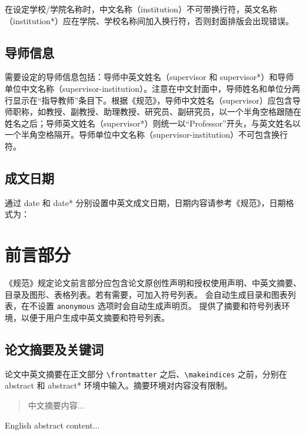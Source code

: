 \documentclass[bachelor, comfort]{shtthesis}
\begin{document}
在设定学校/学院名称时，中文名称（institution）不可带换行符，英文名称（institution*）应在学院、学校名称间加入换行符，否则封面排版会出现错误。
\begin{latex}
\end{latex}

\subsection{导师信息}
需要设定的导师信息包括：导师中英文姓名（supervisor 和 supervisor*）和导师单位中文名称（supervisor-institution）。注意在中文封面中，导师姓名和单位分两行显示在“指导教师”条目下。根据《规范》，导师中文姓名（supervisor）应包含导师职称，如教授、副教授、助理教授、研究员、副研究员，以一个半角空格跟随在姓名之后；导师英文姓名（supervisor*）则统一以“Professor”开头，与英文姓名以一个半角空格隔开。导师单位中文名称（supervisor-institution）不可包含换行符。
\begin{latex}
\end{latex}

\subsection{成文日期}
通过 date 和 date* 分别设置中英文成文日期，日期内容请参考《规范》，日期格式为：
\begin{latex}
\end{latex}

\section{前言部分}
《规范》规定论文前言部分应包含论文原创性声明和授权使用声明、中英文摘要、目录及图形、表格列表。若有需要，可加入符号列表。\shtthesis{} 会自动生成目录和图表列表，在不设置 \verb|anonymous| 选项时会自动生成声明页。\shtthesis{} 提供了摘要和符号列表环境，以便于用户生成中英文摘要和符号列表。

\subsection{论文摘要及关键词}
论文中英文摘要在正文部分 \verb|\frontmatter| 之后、\verb|\makeindices| 之前，分别在 abstract 和 abstract* 环境中输入。摘要环境对内容没有限制。
\begin{latex}
\begin{abstract}
  中文摘要内容...
\end{abstract}

\begin{abstract*}
  English abstract content...
\end{abstract*}
\end{latex}
\end{document}
